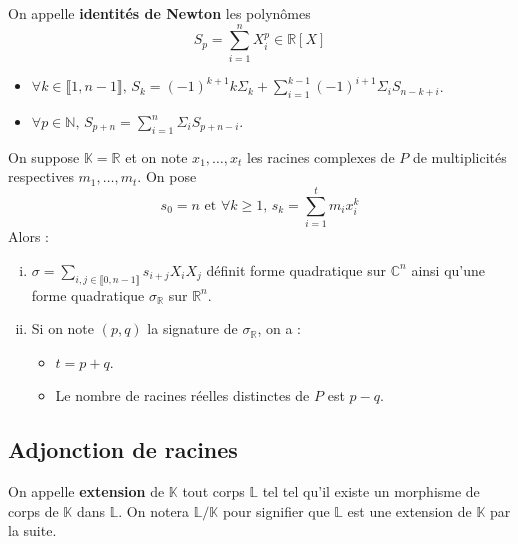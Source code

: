 	
	\begin{definition}
		On appelle \textbf{identités de Newton} les polynômes
		\[ S_p = \sum_{i=1}^n X_i^p \in \mathbb{R}[X] \]
	\end{definition}
	
	\begin{proposition}
		\begin{itemize}
			\item $\forall k \in \llbracket 1, n-1 \rrbracket, \, S_k = (-1)^{k+1} k \Sigma_k + \sum_{i=1}^{k-1} (-1)^{i+1} \Sigma_i S_{n-k+i}$.
			\item $\forall p \in \mathbb{N}, \, S_{p+n} = \sum_{i=1}^n \Sigma_i S_{p+n-i}$.
		\end{itemize}
	\end{proposition}
	
	
	\begin{application}
		On suppose $\mathbb{K} = \mathbb{R}$ et on note $x_1, \dots, x_t$ les racines complexes de $P$ de multiplicités respectives $m_1, \dots, m_t$. On pose
		\[ s_0 = n \text{ et } \forall k \geq 1, \, s_k = \sum_{i=1}^t m_i x_i^k \]
		Alors :
		\begin{enumerate}[(i)]
			\item $\sigma = \sum_{i, j \in \llbracket 0, n-1 \rrbracket} s_{i+j} X_i X_j$ définit forme quadratique sur $\mathbb{C}^n$ ainsi qu'une forme quadratique $\sigma_{\mathbb{R}}$ sur $\mathbb{R}^n$.
			\item Si on note $(p,q)$ la signature de $\sigma_{\mathbb{R}}$, on a :
			\begin{itemize}
				\item $t = p + q$.
				\item Le nombre de racines réelles distinctes de $P$ est $p-q$.
			\end{itemize}
		\end{enumerate}
	\end{application}
	
	\subsection{Adjonction de racines}
	\label{144-1}
	
	
	\begin{definition}
		On appelle \textbf{extension} de $\mathbb{K}$ tout corps $\mathbb{L}$ tel tel qu'il existe un morphisme de corps de $\mathbb{K}$ dans $\mathbb{L}$. On notera $\mathbb{L} / \mathbb{K}$ pour signifier que $\mathbb{L}$ est une extension de $\mathbb{K}$ par la suite.
	\end{definition}
	
